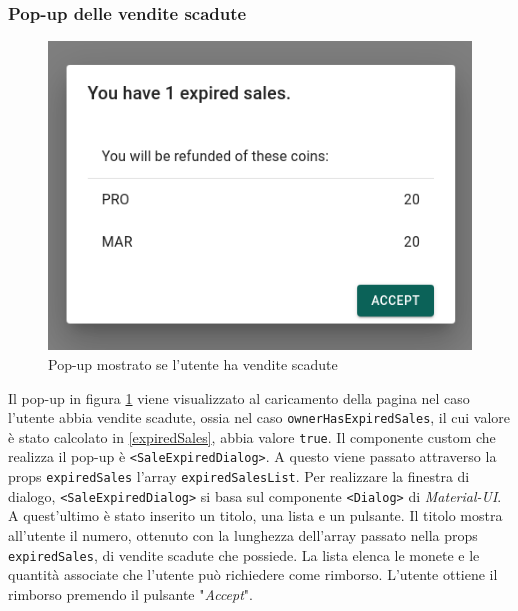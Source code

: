 \documentclass[a4paper]{article}
\begin{document}
        \subsubsection{Pop-up delle vendite scadute}
        \begin{figure}[H]
          \includegraphics[scale=0.5, fbox]{expiredSales.png}
          \centering
          \caption{Pop-up mostrato se l'utente ha vendite scadute}
          \centering
          \label{fig:Pop-up}
        \end{figure}
        Il pop-up in figura \ref{fig:Pop-up} viene visualizzato al caricamento della pagina nel caso l'utente abbia vendite scadute, ossia nel caso \verb|ownerHasExpiredSales|, il cui valore è stato calcolato in  \ref{expiredSales}, abbia valore \verb|true|.
        Il componente custom che realizza il pop-up è \verb|<SaleExpiredDialog>|. A questo viene passato attraverso la props \verb|expiredSales| l'array \verb|expiredSalesList|. Per realizzare la finestra di dialogo, \verb|<SaleExpiredDialog>| si basa sul componente
        \verb|<Dialog>| di \emph{Material-UI}. A quest'ultimo è stato inserito un titolo, una lista e un pulsante. Il titolo mostra all'utente il numero, ottenuto con la lunghezza dell'array passato nella props \verb|expiredSales|, di vendite scadute che possiede.
        La lista elenca le monete e le quantità associate che l'utente può richiedere come rimborso. L'utente ottiene il rimborso premendo il pulsante "\emph{Accept}".
\end{document}

